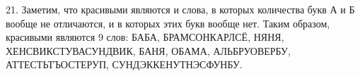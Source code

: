 21. Заметим, что красивыми являются и слова, в которых количества букв А и Б вообще не отличаются, и в которых этих букв вообще нет. Таким образом, красивыми являются 9 слов: БАБА, БРАМСОНКАРЛСЁ, НЯНЯ, ХЕНСВИКСТУВАСУНДВИК, БАНЯ, ОБАМА, АЛЬБРУОВЕРБУ, АТТЕСТЬТЪОСТЕРУП, СУНДЭККЕНУТНЭСФУНБУ.\\
